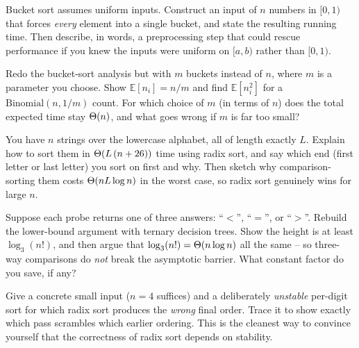 \begin{exercise}
Bucket sort assumes uniform inputs. Construct an input of $n$ numbers in
$[0,1)$ that forces \emph{every} element into a single bucket, and state the
resulting running time. Then describe, in words, a preprocessing step that could
rescue performance if you knew the inputs were uniform on $[a, b)$ rather than
$[0,1)$.
\end{exercise}

\begin{exercise}
Redo the bucket-sort analysis but with $m$ buckets instead of $n$, where $m$ is
a parameter you choose. Show $\mathbb{E}[n_i] = n/m$ and find
$\mathbb{E}[n_i^2]$ for a $\text{Binomial}(n, 1/m)$ count. For which choice of
$m$ (in terms of $n$) does the total expected time stay $\Theta(n)$, and what goes
wrong if $m$ is far too small?
\end{exercise}

\begin{exercise}
You have $n$ strings over the lowercase alphabet, all of length exactly $L$.
Explain how to sort them in $\Theta(L\,(n + 26))$ time using radix sort, and say
which end (first letter or last letter) you sort on first and why. Then sketch
why comparison-sorting them costs $\Theta(n L \log n)$ in the worst case, so radix
sort genuinely wins for large $n$.
\end{exercise}

\begin{exercise}
Suppose each probe returns one of three answers: ``$<$'', ``$=$'', or ``$>$''.
Rebuild the lower-bound argument with ternary decision trees. Show the height is
at least $\log_3(n!)$, and then argue that $\log_3(n!) = \Theta(n\log n)$ all the
same -- so three-way comparisons do \emph{not} break the asymptotic barrier.
What constant factor do you save, if any?
\end{exercise}

\begin{exercise}
Give a concrete small input ($n = 4$ suffices) and a deliberately
\emph{unstable} per-digit sort for which radix sort produces the \emph{wrong}
final order. Trace it to show exactly which pass scrambles which earlier
ordering. This is the cleanest way to convince yourself that the correctness of
radix sort depends on stability.
\end{exercise}
